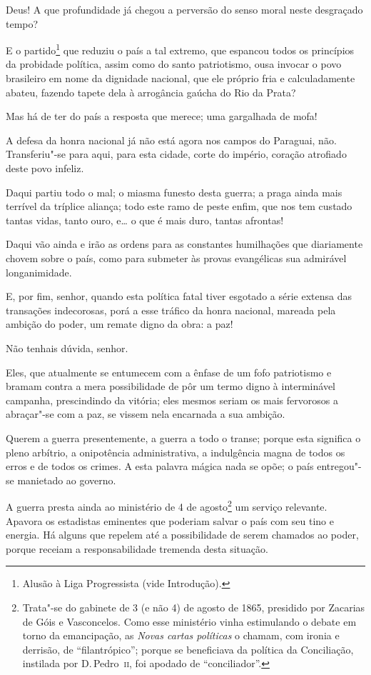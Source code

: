\begin{linenumbers}
 Deus! A que profundidade já chegou a perversão do senso moral neste
desgraçado tempo? 

 E o partido\footnote{ Alusão à Liga Progressista (vide Introdução).}
 que reduziu o país a tal extremo, que espancou todos os princípios da
probidade política, assim como do santo patriotismo, ousa invocar o
povo brasileiro em nome da dignidade nacional, que ele próprio fria e
calculadamente abateu, fazendo tapete dela à arrogância gaúcha do Rio da Prata?

Mas há de ter do país a resposta que merece; uma gargalhada de mofa!

 A defesa da honra nacional já não está agora nos campos do Paraguai,
não. Transferiu"-se para aqui, para esta cidade, corte do império,
coração atrofiado deste povo infeliz. 

 Daqui partiu todo o mal; o miasma funesto desta guerra; a praga ainda
mais terrível da tríplice aliança; todo este ramo de peste enfim, que
nos tem custado tantas vidas, tanto ouro, e\ldots{} o que é mais duro,
tantas afrontas!

 Daqui vão ainda e irão as ordens para as constantes humilhações que
diariamente chovem sobre o país, como para submeter às provas
evangélicas sua admirável longanimidade.

 E, por fim, senhor, quando esta política fatal tiver esgotado a série
extensa das transações indecorosas, porá a esse tráfico da honra
nacional, mareada pela ambição do poder, um remate digno da obra: a paz!

 Não tenhais dúvida, senhor.

 Eles, que atualmente se entumecem com a ênfase de um fofo patriotismo e
bramam contra a mera possibilidade de pôr um termo digno à interminável
campanha, prescindindo da vitória; eles mesmos seriam os mais
fervorosos a abraçar"-se com a paz, se vissem nela encarnada a sua
ambição. 

 Querem a guerra presentemente, a guerra a todo o transe; porque esta
significa o pleno arbítrio, a onipotência administrativa, a indulgência
magna de todos os erros e de todos os crimes. A esta palavra mágica
nada se opõe; o país entregou"-se manietado ao governo.

 A guerra presta ainda ao ministério de 4 de
agosto\footnote{ Trata"-se do gabinete de 3 (e não 4) de agosto de 1865, presidido por 
Zacarias de Góis e Vasconcelos. Como esse ministério vinha estimulando o debate em torno da 
emancipação, as \textit{Novas cartas políticas} o chamam, com ironia e derrisão, de ``filantrópico''; porque se 
beneficiava da política da Conciliação, instilada por D.\,Pedro~\textsc{ii}, foi apodado de ``conciliador''.} 
um serviço relevante. Apavora os estadistas eminentes que poderiam
salvar o país com seu tino e energia. Há alguns que repelem até a
possibilidade de serem chamados ao poder, porque receiam a
responsabilidade tremenda desta situação. 


\end{linenumbers}
